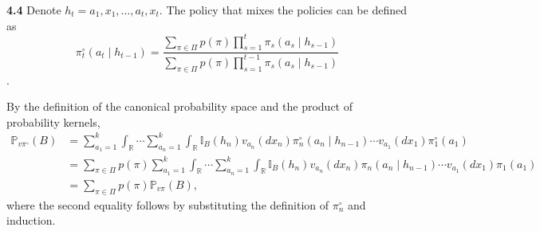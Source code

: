 \noindent\textbf{4.4}
Denote $h_t = a_1, x_1, \ldots, a_t, x_t$.
The policy that mixes the policies can be defined as
$$\pi_{t}^{\circ}\left(a_{t} \mid h_{t-1}\right)=\frac{\sum_{\pi \in \Pi} p(\pi) \prod_{s=1}^{t} \pi_{s}\left(a_{s} \mid h_{s-1}\right)}{\sum_{\pi \in \Pi} p(\pi) \prod_{s=1}^{t-1} \pi_{s}\left(a_{s} \mid h_{s-1}\right)}$$.

By the definition of the canonical probability space and the product of probability kernels,
\begin{equation*}
    \begin{aligned}
    \mathbb{P}_{v \pi^{\circ}}(B) &= \sum_{a_{1}=1}^{k} \int_{\mathbb{R}} \cdots \sum_{a_{n}=1}^{k} \int_{\mathbb{R}} \mathbb{I}_{B}\left(h_{n}\right) v_{a_{n}}\left(d x_{n}\right) \pi_{n}^{\circ}\left(a_{n} \mid h_{n-1}\right) \cdots v_{a_{1}}\left(d x_{1}\right) \pi_{1}^{\circ}\left(a_{1}\right)\\
    &= \sum_{\pi \in \Pi} p(\pi) \sum_{a_{1}=1}^{k} \int_{\mathbb{R}} \cdots \sum_{a_{n}=1}^{k} \int_{\mathbb{R}} \mathbb{I}_{B}\left(h_{n}\right) v_{a_{n}}\left(d x_{n}\right) \pi_{n}\left(a_{n} \mid h_{n-1}\right) \cdots v_{a_{1}}\left(d x_{1}\right) \pi_{1}\left(a_{1}\right)\\
    &= \sum_{\pi \in \Pi} p(\pi) \mathbb{P}_{v \pi}(B),
    \end{aligned}
\end{equation*}
where the second equality follows by substituting the definition of $\pi_{n}^{\circ}$ and induction.
